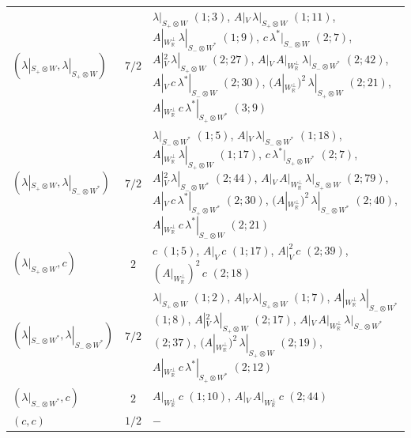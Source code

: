 \begin{tabular}{l|c|l}
$(\lambda|_{S_+\otimes W},\lambda|_{S_+\otimes W})$ & $7/2$ & $\lambda|_{S_+\otimes W}$ $(1;3)$, $A|_V\,\lambda|_{S_+\otimes W}$ $(1;11)$, $A|_{W_{\mathbb R}^\perp}\,\lambda|_{S_-\otimes W^*}$ $(1;9)$, $c\,\lambda^*|_{S_-\otimes W}$ $(2;7)$, $A|_V^2\,\lambda|_{S_+\otimes W}$ $(2;27)$, $A|_V\,A|_{W_{\mathbb R}^\perp}\,\lambda|_{S_-\otimes W^*}$ $(2;42)$, $A|_V\,c\,\lambda^*|_{S_-\otimes W}$ $(2;30)$, $(A|_{W_{\mathbb R}^\perp})^2\,\lambda|_{S_+\otimes W}$ $(2;21)$, $A|_{W_{\mathbb R}^\perp}\,c\,\lambda^*|_{S_+\otimes W^*}$ $(3;9)$\\
$(\lambda|_{S_+\otimes W},\lambda|_{S_-\otimes W^*})$ & $7/2$ & $\lambda|_{S_-\otimes W^*}$ $(1;5)$, $A|_V\,\lambda|_{S_-\otimes W^*}$ $(1;18)$, $A|_{W_{\mathbb R}^\perp}\,\lambda|_{S_+\otimes W}$ $(1;17)$, $c\,\lambda^*|_{S_+\otimes W^*}$ $(2;7)$, $A|_V^2\,\lambda|_{S_-\otimes W^*}$ $(2;44)$, $A|_V\,A|_{W_{\mathbb R}^\perp}\,\lambda|_{S_+\otimes W}$ $(2;79)$, $A|_V\,c\,\lambda^*|_{S_+\otimes W^*}$ $(2;30)$, $(A|_{W_{\mathbb R}^\perp})^2\,\lambda|_{S_-\otimes W^*}$ $(2;40)$, $A|_{W_{\mathbb R}^\perp}\,c\,\lambda^*|_{S_-\otimes W}$ $(2;21)$\\
$(\lambda|_{S_+\otimes W},c)$ & $2$ & $c$ $(1;5)$, $A|_V\,c$ $(1;17)$, $A|_V^2\,c$ $(2;39)$, $(A|_{W_{\mathbb R}^\perp})^2\,c$ $(2;18)$\\
$(\lambda|_{S_-\otimes W^*},\lambda|_{S_-\otimes W^*})$ & $7/2$ & $\lambda|_{S_+\otimes W}$ $(1;2)$, $A|_V\,\lambda|_{S_+\otimes W}$ $(1;7)$, $A|_{W_{\mathbb R}^\perp}\,\lambda|_{S_-\otimes W^*}$ $(1;8)$, $A|_V^2\,\lambda|_{S_+\otimes W}$ $(2;17)$, $A|_V\,A|_{W_{\mathbb R}^\perp}\,\lambda|_{S_-\otimes W^*}$ $(2;37)$, $(A|_{W_{\mathbb R}^\perp})^2\,\lambda|_{S_+\otimes W}$ $(2;19)$, $A|_{W_{\mathbb R}^\perp}\,c\,\lambda^*|_{S_+\otimes W^*}$ $(2;12)$\\
$(\lambda|_{S_-\otimes W^*},c)$ & $2$ & $A|_{W_{\mathbb R}^\perp}\,c$ $(1;10)$, $A|_V\,A|_{W_{\mathbb R}^\perp}\,c$ $(2;44)$\\
$(c,c)$ & $1/2$ & $-$\\
\end{tabular}


